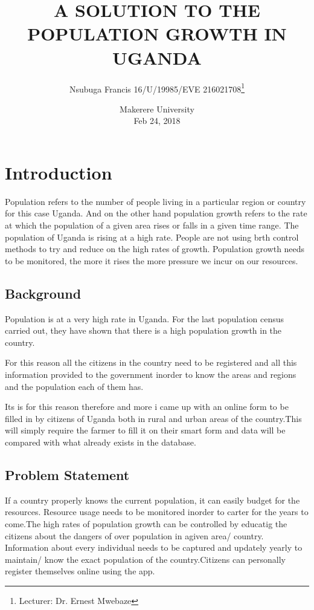 \documentclass[options]{article}
\title{A SOLUTION TO THE  POPULATION GROWTH IN UGANDA}
\author{Nsubuga Francis  16/U/19985/EVE  216021708\thanks{Lecturer: Dr. Ernest Mwebaze}}\newpage
\date{%
    Makerere University\\%
    Feb 24, 2018
}
\begin{document}
\begin{titlepage}
\maketitle
\end{titlepage}




\newpage
{} 
\section{\textbf{ Introduction}} 

Population refers to the number of people living in a particular region or country for this case Uganda. And on the other hand population growth refers to the rate at which the population of a given area rises or falls in a given time range. The population of Uganda is rising at a high rate. People are not using brth control methods to try and reduce on the high rates of growth. Population growth needs to be monitored, the more it rises the more pressure we incur on our resources. 

 


\subsection{\textbf{Background}}
Population is at a very high rate in Uganda. For the last population census carried out, they have shown that there is a high population growth in the country. 
\bigbreak


 For this reason all the citizens in the country need to be registered and all this information provided to the government inorder to know the areas and regions and the population each of them has.

\bigbreak
Its is for this reason therefore and more i came up with an online form to be filled in by citizens of Uganda both in rural and urban areas of the country.This will simply require the farmer to fill it on their smart form and data will be compared with what already exists
in the database.


\subsection{\textbf{Problem Statement}}

If a country properly knows the current population, it can easily budget for the resources. Resource usage needs to be monitored inorder to carter for the years to come.The high rates of population growth  can be controlled by educatig the citizens about the dangers of over population in agiven area/ country. Information about every individual needs to be captured and updately yearly to maintain/ know the exact population of the country.Citizens can personally register themselves online using the app.
\end{document}
